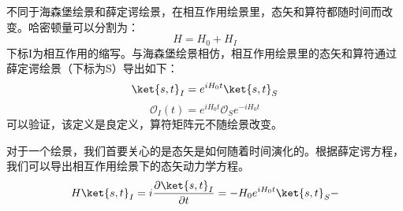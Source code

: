 \begin{definition}{}

不同于海森堡绘景和薛定谔绘景，在相互作用绘景里，态矢和算符都随时间而改变。哈密顿量可以分割为：
\begin{equation}
H=H_0+H_I
\end{equation}
下标I为相互作用的缩写。与海森堡绘景相仿，相互作用绘景里的态矢和算符通过薛定谔绘景（下标为S）导出如下：
\begin{equation}
\ket{s,t}_I=e^{iH_0 t}\ket{s,t}_S
\end{equation}
\begin{equation}
\mathcal O_I(t)=e^{iH_0 t}\mathcal O_Se^{-iH_0 t}
\end{equation}
可以验证，该定义是良定义，算符矩阵元不随绘景改变。
\end{definition}
对于一个绘景，我们首要关心的是态矢是如何随着时间演化的。根据薛定谔方程，我们可以导出相互作用绘景下的态矢动力学方程。
\begin{equation}
H\ket{s,t}_I=i\frac{\partial\ket{s,t}_I}{\partial t}=-H_0 e^{iH_0 t}\ket{s,t}_S-
\end{equation}


